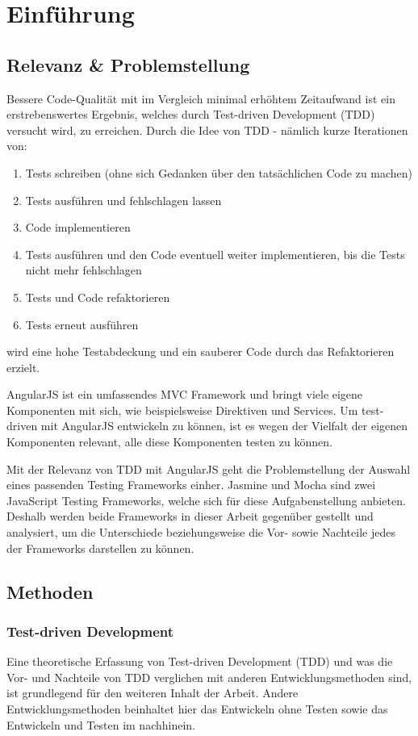 \section{Einführung}
\label{Einführung}
\subsection{Relevanz \& Problemstellung}
Bessere Code-Qualität mit im Vergleich minimal erhöhtem Zeitaufwand ist ein
erstrebenswertes Ergebnis, welches durch Test-driven Development (TDD) versucht
wird, zu erreichen. Durch die Idee von TDD - nämlich kurze Iterationen von:
\begin{enumerate}
  \item Tests schreiben (ohne sich Gedanken über den tatsächlichen Code zu machen)
  \item Tests ausführen und fehlschlagen lassen
  \item Code implementieren
  \item Tests ausführen und den Code eventuell weiter implementieren, bis die 
  Tests nicht mehr fehlschlagen
  \item Tests und Code refaktorieren
  \item Tests erneut ausführen
\end{enumerate}
wird eine hohe Testabdeckung und ein sauberer Code durch das Refaktorieren 
erzielt.

AngularJS ist ein umfassendes MVC Framework und bringt viele eigene Komponenten
mit sich, wie beispielsweise Direktiven und Services. Um test-driven mit 
AngularJS entwickeln zu können, ist es wegen der Vielfalt der eigenen 
Komponenten relevant, alle diese Komponenten testen zu können.

Mit der Relevanz von TDD mit AngularJS geht die Problemstellung der Auswahl 
eines passenden Testing Frameworks einher. Jasmine und Mocha sind zwei 
JavaScript Testing Frameworks, welche sich für diese Aufgabenstellung anbieten. 
Deshalb werden beide Frameworks in dieser Arbeit gegenüber gestellt und 
analysiert, um die Unterschiede beziehungsweise die Vor- sowie Nachteile jedes der 
Frameworks darstellen zu können.

\subsection{Methoden}
\subsubsection{Test-driven Development}
Eine theoretische Erfassung von Test-driven Development (TDD) und was die
Vor- und Nachteile von TDD verglichen mit anderen Entwicklungsmethoden sind, 
ist grundlegend für den weiteren Inhalt der Arbeit. Andere Entwicklungsmethoden
beinhaltet hier das Entwickeln ohne Testen sowie das Entwickeln und Testen im
nachhinein.

